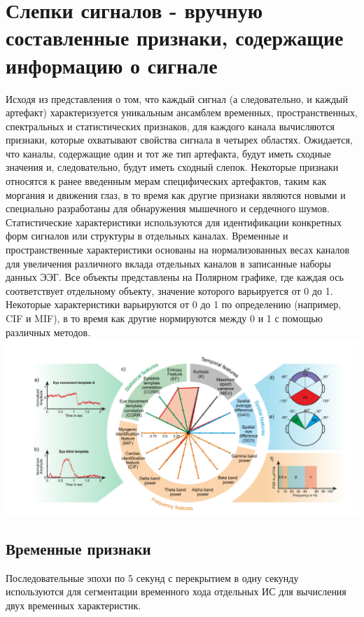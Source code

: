 \documentclass[12pt, a4paper, titlepage]{extreport}
\begin{document}
	\section*{Слепки сигналов - вручную составленные признаки, содержащие информацию о сигнале}
	Исходя из представления о том, что каждый сигнал (а следовательно, и каждый артефакт) характеризуется уникальным ансамблем временных, пространственных, спектральных и статистических признаков, для каждого канала вычисляются признаки, которые охватывают свойства сигнала в четырех областях. Ожидается, что каналы, содержащие один и тот же тип артефакта, будут иметь сходные значения и, следовательно, будут иметь сходный слепок. Некоторые признаки относятся к ранее введенным мерам специфических артефактов, таким как моргания и движения глаз, в то время как другие признаки являются новыми и специально разработаны для обнаружения мышечного и сердечного шумов. Статистические характеристики используются для идентификации конкретных форм сигналов или структуры в отдельных каналах.
	Временные и пространственные характеристики основаны на нормализованных весах каналов для увеличения различного вклада отдельных каналов в записанные наборы данных ЭЭГ. Все объекты представлены на Полярном графике, где каждая ось соответствует отдельному объекту, значение которого варьируется от 0 до 1. Некоторые характеристики варьируются от 0 до 1 по определению (например, CIF и MIF), в то время как другие нормируются между 0 и 1 с помощью различных методов.\\
	\includegraphics[scale=0.5]{features.png}\\
	\subsection*{Временные признаки}
	Последовательные эпохи по 5 секунд с перекрытием в одну секунду используются для сегментации временного хода отдельных ИС для вычисления двух временных характеристик.
	
\end{document}
